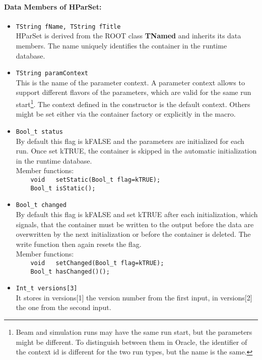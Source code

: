 \paragraph{Data Members of HParSet:}
\begin{itemize}
 \item \verb+TString fName, TString fTitle+\\
   HParSet is derived from the ROOT class \textbf{TNamed} and inherits its data members. The name uniquely identifies the 
   container in the runtime database.
 \item \verb+TString paramContext+\\
   This is the name of the parameter context. A parameter context allows to support different flavors of the parameters, 
   which are valid for the same run start\footnote{Beam and simulation runs may have the same run start, but the parameters 
   might be different. To distinguish between them in Oracle, the identifier of the context id is different for the 
   two run types, but the name is the same.}. The context defined in the constructor is the default context. Others might be set 
   either via the container factory or explicitly in the macro.
 \item \verb+Bool_t status+\\
   By default this flag is kFALSE and the parameters are initialized for each run. Once set kTRUE, the container is skipped 
   in the automatic initialization in the runtime database.\\
   Member functions:\\
   \verb+    void   setStatic(Bool_t flag=kTRUE);+\\
   \verb+    Bool_t isStatic();+
 \item \verb+Bool_t changed+\\
   By default this flag is kFALSE and set kTRUE after each initialization, which signals, that the container must be written 
   to the output before the data are overwritten by the next initialization or before the container is deleted. The write 
   function then again resets the flag.\\
   Member functions:\\
   \verb+    void   setChanged(Bool_t flag=kTRUE);+\\
   \verb+    Bool_t hasChanged()();+
 \item \verb+Int_t versions[3]+\\
   It stores in versions[1] the version number from the first input, in versions[2] the one from the second input.\\

\end{itemize}
